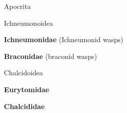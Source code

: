 \documentclass[letterpaper,10pt]{article}
\begin{document}
{\makebox[0.20cm]{}  Apocrita \par
\makebox[0.4cm]{}  Ichneumonoidea \par
\makebox[0.6cm]{}  \textbf{Ichneumonidae} (Ichneumonid wasps) \par
\makebox[0.6cm]{}  \textbf{Braconidae} (braconid wasps) \par
\makebox[0.4cm]{}  Chalcidoidea \par
\makebox[0.6cm]{}  \textbf{Eurytomidae} \par
\makebox[0.6cm]{}  \textbf{Chalcididae} \par
}
\end{document}
